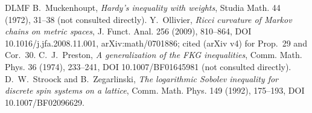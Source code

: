 \documentclass[11pt,a4paper]{article}
\theoremstyle{definition}
\theoremstyle{remark}
\begin{document}
\begin{thebibliography}{DLMF}
 B.~Muckenhoupt, \emph{Hardy's inequality with weights}, Studia Math. 44 (1972), 31--38 (not consulted directly).
 Y.~Ollivier, \emph{Ricci curvature of Markov chains on metric spaces}, J. Funct. Anal. 256 (2009), 810--864, DOI 10.1016/j.jfa.2008.11.001, arXiv:math/0701886; cited (arXiv v4) for Prop.~29 and Cor.~30.
 C.~J.~Preston, \emph{A generalization of the FKG inequalities}, Comm. Math. Phys. 36 (1974), 233--241, DOI 10.1007/BF01645981 (not consulted directly).
 D.~W.~Stroock and B.~Zegarlinski, \emph{The logarithmic Sobolev inequality for discrete spin systems on a lattice}, Comm. Math. Phys. 149 (1992), 175--193, DOI 10.1007/BF02096629.
\end{thebibliography}
\end{document}
